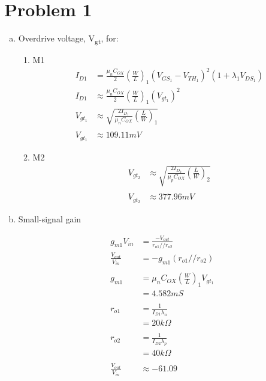 \documentclass{article}
\begin{document}
\section{Problem 1}
\label{sec:org853fe77}
\begin{enumerate}[(a)]
\item Overdrive voltage, V\textsubscript{gt}, for:
\begin{enumerate}[1.]
\item M1
\begin{equation*}
\begin{aligned}
I_{D1} &= \frac{\mu_{n}C_{OX}}{2}(\frac{W}{L})_{1}(V_{GS_{1}} - V_{TH_{1}})^2(1 + \lambda_{1}V_{DS_{1}}) \\
I_{D1} &\approx \frac{\mu_{n}C_{OX}}{2}(\frac{W}{L})_{1}(V_{gt_{1}})^2 \\
V_{gt_{1}} &\approx \sqrt{\frac{2 I_{D_{1}}}{\mu_{n}C_{OX}}(\frac{L}{W})_{1}} \\
\\
V_{gt_{1}} &\approx 109.11 mV
\end{aligned}
\end{equation*}

\item M2
\begin{equation*}
\begin{aligned}
V_{gt_{2}} &\approx \sqrt{\frac{2 I_{D_{2}}}{\mu_{p}C_{OX}}(\frac{L}{W})_{2}} \\
\\
V_{gt_{2}} &\approx 377.96 mV
\end{aligned}
\end{equation*}
\end{enumerate}

\item Small-signal gain

\begin{equation*}
\begin{aligned}
g_{m1}V_{in} &= \frac{-V_{out}}{r_{o1}//r_{o2}} \\
\frac{V_{out}}{V_{in}} &= -g_{m1}(r_{o1}//r_{o2}) \\
\\
g_{m1} &= \mu_{n}C_{OX} (\frac{W}{L})_{1} V_{gt_1} \\
&= 4.582 mS \\
\\
r_{o1} &= \frac{1}{I_{D1}\lambda_{n}} \\
&= 20 k\Omega \\
\\
r_{o2} &= \frac{1}{I_{D2}\lambda_{p}} \\
&= 40 k\Omega \\
\\
\frac{V_{out}}{V_{in}} &\approx -61.09 \\
\end{aligned}
\end{equation*}


\end{enumerate}
\end{document}
